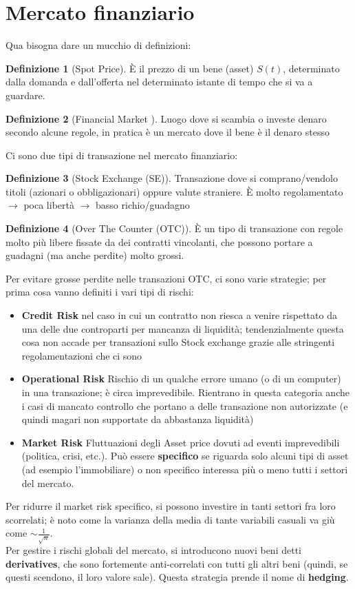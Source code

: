 \documentclass[a4paper,12pt]{article}
\theoremstyle{plain}
\theoremstyle{definition}
\newtheorem{defn}{Definizione}[section]
\newcommand{\f}[2]{\frac{#1}{#2}}
\theoremstyle{remark}
\begin{document}
\section{Mercato finanziario}
Qua bisogna dare un mucchio di definizioni:


\begin{defn}[Spot Price]
	È il prezzo di un bene (asset) $S(t)$, determinato dalla domanda e dall'offerta nel determinato istante di tempo che si va a guardare.
\end{defn}


\begin{defn}[Financial Market ]
	Luogo dove si scambia o investe denaro secondo alcune regole, in pratica è un mercato dove il bene è il denaro stesso
\end{defn}

Ci sono due tipi di transazione nel mercato finanziario:
\begin{defn}[Stock Exchange (SE)]
Transazione dove si comprano/vendolo titoli (azionari o obbligazionari) oppure valute straniere. È molto regolamentato $\rightarrow$ poca libertà $\rightarrow$ basso richio/guadagno


\end{defn}
\begin{defn}[Over The Counter (OTC)]
	È un tipo di transazione con regole molto più libere fissate da dei contratti vincolanti, che possono portare a guadagni (ma anche perdite) molto grossi.
\end{defn}
Per evitare grosse perdite nelle transazioni OTC, ci sono varie strategie; per prima cosa vanno definiti i vari tipi di rischi:
\begin{itemize}
	\item \textbf{Credit Risk} nel caso in cui un contratto non riesca a venire rispettato da una delle due controparti per mancanza di liquidità; tendenzialmente questa cosa non accade per transazioni sullo Stock exchange grazie alle stringenti regolamentazioni che ci sono
	\item \textbf{Operational Risk} Rischio di un qualche errore umano (o di un computer) in una transazione; è circa imprevedibile. Rientrano in questa categoria anche i casi di mancato controllo che portano a delle transazione non autorizzate (e quindi magari non supportate da abbastanza liquidità)
	\item \textbf{Market Risk} Fluttuazioni degli Asset price dovuti ad eventi imprevedibili (politica, crisi, etc.). Può essere \textbf{specifico} se riguarda solo alcuni tipi di asset (ad esempio l'immobiliare) o non specifico interessa più o meno tutti i settori del mercato.
\end{itemize}
Per ridurre il market risk specifico, si possono investire in tanti settori fra loro scorrelati; è noto come la varianza della media di tante variabili casuali va giù come $\sim \f{1}{\sqrt{n}}$.
\\Per gestire i rischi globali del mercato, si introducono nuovi beni detti \textbf{derivatives}, che sono fortemente anti-correlati con tutti gli altri beni (quindi, se questi scendono, il loro valore sale). Questa strategia prende il nome di \textbf{hedging}.
\end{document}
